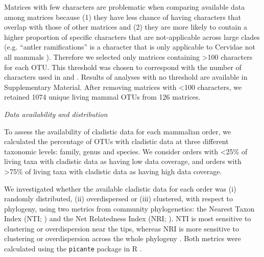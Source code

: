 \documentclass[12pt,letterpaper]{article}
\renewcommand{\subsection}[1]{%
\bigskip
\begin{center}
\begin{large}
\normalfont\itshape #1
\end{large}
\end{center}}
\begin{document}
Matrices with few characters are problematic when comparing available data among matrices because (1) they have less chance of having characters that overlap with those of other matrices \cite{wagner2000} and (2) they are more likely to contain a higher proportion of specific characters that are not-applicable across large clades (e.g. ``antler ramifications'' is a character that is only applicable to Cervidae not all mammals \cite{Brazeau2011}).
Therefore we selected only matrices containing \textgreater 100 characters for each OTU.
This threshold was chosen to correspond with the number of characters used in \cite{GuillermeCooper} and \cite{harrisonamong-character2014}.
Results of analyses with no threshold are available in Supplementary Material. 
After removing matrices with \textless 100 characters, we retained 1074 unique living mammal OTUs from 126 matrices. %

\subsection{Data availability and distribution}
To assess the availability of cladistic data for each mammalian order, we calculated the percentage of OTUs with cladistic data at three different taxonomic levels: family, genus and species.
We consider orders with \textless 25\% of living taxa with cladistic data as having low data coverage, and orders with \textgreater 75\% of living taxa with cladistic data as having high data coverage. 

We investigated whether the available cladistic data for each order was (i) randomly distributed, (ii) overdispersed or (iii) clustered, with respect to phylogeny, using two metrics from community phylogenetics: the Nearest Taxon Index (NTI; \cite{webb2002phylogenies}) and the Net Relatedness Index (NRI; \cite{webb2002phylogenies}). 
NTI is most sensitive to clustering or overdispersion near the tips, whereas NRI is more sensitive to clustering or overdispersion across the whole phylogeny \cite{Cooper2008}. 
Both metrics were calculated using the \texttt{picante} package in R \cite{picante,R}.
\end{document}
